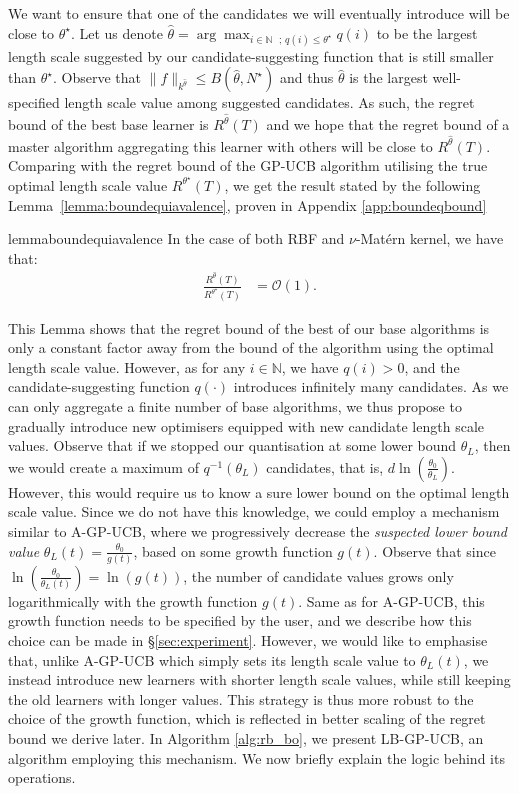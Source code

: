 \documentclass{article}
\theoremstyle{plain}
\theoremstyle{definition}
\theoremstyle{remark}
\theoremstyle{plain}
\begin{document}
We want to ensure that one of the candidates we will eventually introduce will be close to $\theta^\star$.
Let us denote $\hat{\theta} = \arg\max_{i \in \mathbb{N} \textrm{ }; \, q(i) \le \theta^\star} q(i) $ to be the largest length scale suggested by our candidate-suggesting function that is still smaller than $\theta^\star$. Observe that $\lVert f \rVert_{k^{\hat{\theta}}} \le B(\hat{\theta}, N^\star)$ and thus $\hat{\theta}$ is the largest well-specified length scale value among suggested candidates. As such, the regret bound of the best base learner is $R^{\hat{\theta}}(T)$ and we hope that the regret bound of a master algorithm aggregating this learner with others will be close to $R^{\hat{\theta}}(T)$. Comparing with the regret bound of the GP-UCB algorithm utilising the true optimal length scale value $R^{\theta^\star}(T)$, we get the result stated by the following Lemma~\ref{lemma:boundequiavalence}, proven in Appendix \ref{app:boundeqbound}
\begin{restatable}[]{lemma}{boundequiavalence} \label{lemma:boundequiavalence}
    In the case of both RBF and $\nu$-Matérn kernel, we have that:
    \begin{align*}
   \frac{R^{\hat{\theta}}(T)}{R^{\theta^\star}(T)} & = \mathcal{O}\left(1\right) .
\end{align*}
\end{restatable}

This Lemma shows that the regret bound of the best of our base algorithms is only a constant factor away from the bound of the algorithm using the optimal length scale value. However, as for any $i \in \mathbb{N}$, we have $q(i) > 0$, and the candidate-suggesting function $q(\cdot)$ introduces infinitely many candidates. As we can only aggregate a finite number of base algorithms, we thus propose to gradually introduce new optimisers equipped with new candidate length scale values. Observe that if we stopped our quantisation at some lower bound $\theta_L$, then we would create a maximum of $q^{-1}(\theta_L)$ candidates, that is, $d \ln(\frac{\theta_0}{\theta_L})$. However, this would require us to know a sure lower bound on the optimal length scale value. Since we do not have this knowledge, we could employ a mechanism similar to A-GP-UCB, where we progressively decrease the \textit{suspected lower bound value} $\theta_L(t) = \frac{\theta_0}{g(t)}$, based on some growth function $g(t)$. Observe that since $\ln \left(\frac{\theta_0}{\theta_L(t)}\right) = \ln(g(t))$, the number of candidate values grows only logarithmically with the growth function $g(t)$. Same as for A-GP-UCB, this growth function needs to be specified by the user, and we describe how this choice can be made in §\ref{sec:experiment}. However, we would like to emphasise that, unlike A-GP-UCB which simply sets its length scale value to $\theta_L(t)$, we instead introduce new learners with shorter length scale values, while still keeping the old learners with longer values. This strategy is thus more robust to the choice of the growth function, which is reflected in better scaling of the regret bound we derive later. In Algorithm \ref{alg:rb_bo}, we present LB-GP-UCB, an algorithm employing this mechanism. We now briefly explain the logic behind its operations.
\end{document}
